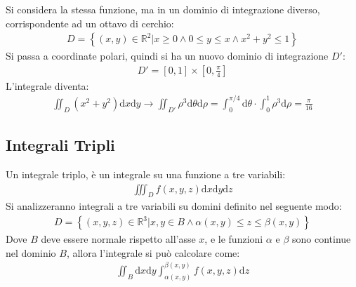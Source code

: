 \documentclass{article}
\newcommand{\df}{\mathrm{d}}
\numberwithin{equation}{subsection}
\begin{document}
Si considera la stessa funzione, ma in un dominio di integrazione diverso, corrispondente ad un ottavo di cerchio:
\begin{gather*}
    D=\left\{(x,y)\in\mathbb{R}^2\big|x\geq0\land 0\leq y\leq x\land x^2+y^2\leq 1\right\}
\end{gather*}
Si passa a coordinate polari, quindi si ha un nuovo dominio di integrazione $D'$:
\begin{gather*}
    D'=[0,1]\times\left[0,\frac{\pi}{4}\right]
\end{gather*}
L'integrale diventa:
\begin{gather*}
    \iint_D(x^2+y^2)\df x\df y\to\iint_{D'}\rho^3\df\theta\df\rho=\int_0^{\pi/4}\df\theta\cdot\int_0^{1}\rho^3\df\rho=\frac{\pi}{16}
\end{gather*}

\subsection{Integrali Tripli}

Un integrale triplo, è un integrale su una funzione a tre variabili:
\begin{gather*}
    \iiint_Df(x,y,z)\df x\df y\df z
\end{gather*}
Si analizzeranno integrali a tre variabili su domini definito nel seguente modo:
\begin{gather*}
    D=\left\{(x,y,z)\in\mathbb{R}^3\big|x,y\in B\land \alpha(x,y)\leq z\leq \beta(x,y)\right\}
\end{gather*}
Dove $B$ deve essere normale rispetto all'asse $x$, e le funzioni $\alpha$ e $\beta$ sono continue nel dominio $B$, allora l'integrale si può calcolare come:
\begin{gather*}
    \iint_B\df x\df y\int_{\alpha(x,y)}^{\beta(x,y)}f(x,y,z)\df z
\end{gather*}
\end{document}
